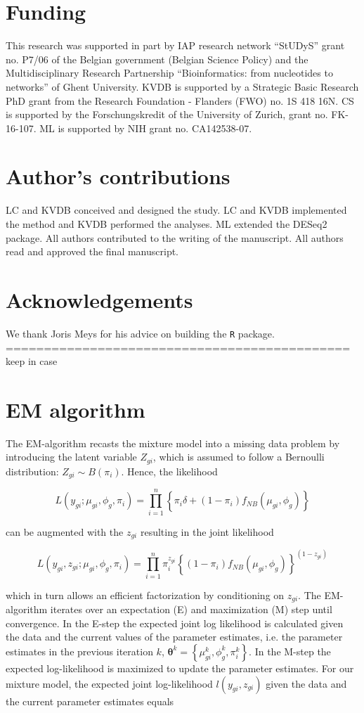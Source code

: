 \documentclass{bmcart}
\newcommand{\mb}[1]{\boldsymbol{\mathbf{#1}}}
\begin{document}
\begin{backmatter}
\section*{Funding}
This research was supported in part by IAP research network ``StUDyS'' grant no. P7/06 of the Belgian government (Belgian Science Policy) and the Multidisciplinary Research Partnership ``Bioinformatics: from nucleotides to networks'' of Ghent University. KVDB is supported by a Strategic Basic Research PhD grant from the Research Foundation - Flanders (FWO) no. 1S 418 16N.
 CS is supported by the Forschungskredit of the University of Zurich, grant no. FK-16-107. ML is supported by NIH grant no. CA142538-07. 
 
\section*{Author's contributions}
LC and KVDB conceived and designed the study. LC and KVDB implemented the method and KVDB performed the analyses. ML extended the DESeq2 package. All authors contributed to the writing of the manuscript. All authors read and approved the final manuscript.

\section*{Acknowledgements}
We thank Joris Meys for his advice on building the \texttt{R} package.\\


============================================= keep in case
\section*{EM algorithm}
The EM-algorithm recasts the mixture model into a missing data problem by introducing the latent variable $Z_{gi}$, which is assumed to follow a Bernoulli distribution: $Z_{gi} \sim B(\pi_i)$.
Hence, the likelihood

\[ L(y_{gi};\mu_{gi},\phi_g,\pi_i) = \prod_{i=1}^n \left\{ \pi_i\delta + (1-\pi_i)f_{NB}(\mu_{gi},\phi_g) \right\} \]

can be augmented with the $z_{gi}$ resulting in the joint likelihood

\[ L(y_{gi},z_{gi};\mu_{gi},\phi_g,\pi_i) = \prod_{i=1}^n  \pi_i^{z_{gi}} \left\{ (1-\pi_i)f_{NB}(\mu_{gi},\phi_g) \right\}^{(1-z_{gi})} \]

which in turn allows an efficient factorization by conditioning on $z_{gi}$.
The EM-algorithm iterates over an expectation (E) and maximization (M) step until convergence.
In the E-step the expected joint log likelihood is calculated given the data and the current values of the parameter estimates, i.e. the parameter estimates in the previous iteration $k$, $\mb{\theta}^k = \left\{ \mu_{gi}^k, \phi_g^k, \pi_i^k \right\}$.
In the M-step the expected log-likelihood is maximized to update the parameter estimates.
For our mixture model, the expected joint log-likelihood $l(y_{gi},z_{gi})$ given the data and the current parameter estimates equals


\end{backmatter}
\end{document}

